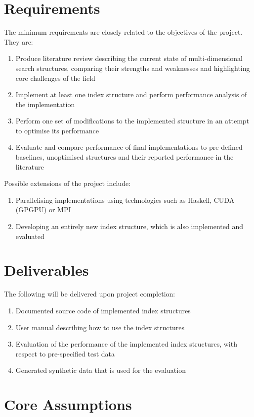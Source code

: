 \section{Requirements}

The minimum requirements are closely related to the objectives of the project. They are:
\begin{enumerate}
	\item Produce literature review describing the current state of multi-dimensional search structures, comparing their strengths and weaknesses and highlighting core challenges of the field
	\item Implement at least one index structure and perform performance analysis of the implementation
	\item Perform one set of modifications to the implemented structure in an attempt to optimise its performance
	\item Evaluate and compare performance of final implementations to pre-defined baselines, unoptimised structures and their reported performance in the literature
\end{enumerate}

Possible extensions of the project include:
\begin{enumerate}
	\item Parallelising implementations using technologies such as Haskell, CUDA (GPGPU) or MPI
	\item Developing an entirely new index structure, which is also implemented and evaluated
\end{enumerate}

\section{Deliverables}

The following will be delivered upon project completion:
\begin{enumerate}
	\item Documented source code of implemented index structures
	\item User manual describing how to use the index structures
	\item Evaluation of the performance of the implemented index structures, with respect to pre-specified test data
	\item Generated synthetic data that is used for the evaluation
\end{enumerate}

\section{Core Assumptions}
\label{sec:core-assumptions}

